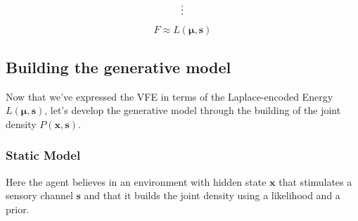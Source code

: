 \documentclass[a4paper, 10pt]{article}
\begin{document}
\begin{comment}
Now is possible to rewrite the variational free energy as
\begin{equation}
F(\bm \mu, \bm{\hat{\Sigma}}, \mathbf s) \approx L(\bm \mu,\mathbf s) + \frac{1}{2}\left( D \left[ \nabla^2 L(\mathbf x, \mathbf s) \right]_{x=\mu} \bm - \ln \left( (2 \pi)^{D} \det \bm \Sigma \right) - D \right)
\end{equation}
with again $L(\bm \mu,\mathbf s)$ as \emph{Laplace-encoded energy}, and the variational free energy written as a function and not anymore as a functional.

Since the goal is to minimize the Kullback-Leibler divergence trough the minimization of the VFE, is possible to simplify further removing the $\Sigma$ dependency taking the derivative with respect this and imposing $\frac{dF}{d\Sigma}=0$
\begin{equation}
\frac{dF}{d\Sigma}= \frac{1}{2} \left( \left[ \frac{d^2L(x,s)}{dx^2} \right]_{x=\mu} - \frac{1}{\Sigma} \right) = 0
\end{equation}
\begin{equation}
\Rightarrow \Sigma = \left[ \frac{d^2L(x,s)}{dx^2} \right]_{x=\mu}^{-1} \equiv \Sigma^{\ast}
\end{equation}

The final form of the VFE is then
\begin{equation}
F \approx L(\mu,s) - \frac{1}{2} \ln \left( 2 \pi \Sigma^{\ast} \right)
\end{equation}
\end{comment}

\begin{equation}
\vdots \notag
\end{equation}

\begin{equation}
F \approx L(\bm \mu,\mathbf s)
\end{equation}






\subsection{Building the generative model}
Now that we've expressed the VFE in terms of the Laplace-encoded Energy $L(\bm \mu , \mathbf s)$, let's develop the generative model through the building of the joint density $P(\mathbf x,\mathbf s)$.

\subsubsection{Static Model}
Here the agent believes in an environment with hidden state $\mathbf x$ that stimulates a sensory channel $\mathbf s$ and that it builds the joint density using a likelihood and a prior.
\end{document}
